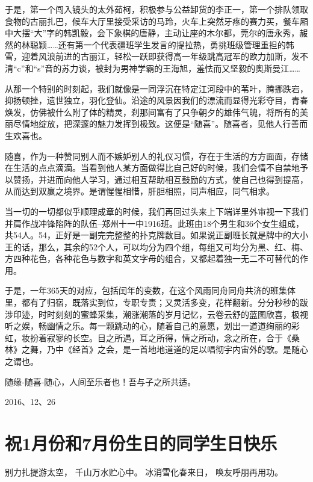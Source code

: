 \documentclass[openany]{ctexbook}
\begin{document}
于是，第一个闯入镜头的太外茹柯，积极参与公益卸货的李正一，第一个排队领取食物的古丽扎巴，候车大厅里接受采访的马玲，火车上突然牙疼的赛力买，餐车厢中大摆``大''字的韩凯毅，会下象棋的唐静，主动让座的木尔都，莞尔的唐永秀，赧然的林聪颖\ldots{}\ldots{}还有第一个代表疆班学生发言的提拉热，勇挑班级管理重担的韩雪，迎着风浪前进的古丽江，轻松一跃即获得高一年级跳高冠军的欧力加斯，发不清``c''和``s''音的苏力谈，被封为男神学霸的王海旭，羞怯而又坚毅的奥斯曼江\ldots{}\ldots{}

从那一个特别的时刻起，我们就像是一同浮沉在特定江河段中的苇叶，腾挪跌宕，抑扬顿挫，遗世独立，羽化登仙。沿途的风景因我们的漂流而显得光彩夺目，青春焕发，仿佛被什么附了体的精灵，刹那间富有了只争朝夕的雄伟气魄，将所有的美丽尽情地绽放，把深邃的魅力发挥到极致。这便是``随喜''。随喜者，见他人行善而生欢喜也。

随喜，作为一种赞同别人而不嫉妒别人的礼仪习惯，存在于生活的方方面面，存储在生活的点点滴滴。当看到他人某方面做得比自己好的时候，我们会情不自禁地予以赞扬，并进而向他人学习，通过相互帮助相互鼓励的方式，使自己也得到提高，从而达到双赢之境界。是谓惺惺相惜，肝胆相照，同声相应，同气相求。

当一切的一切都似乎顺理成章的时候，我们再回过头来上下端详里外审视一下我们并肩作战冲锋陷阵的队伍--郑州十一中1916班。此班由18个男生和36个女生组成，共54人。54，正好是一副完完整整的扑克牌数目。如果说正副班长就是牌中的大小王的话，那么，其余的52个人，可以均分为四个组，每组又可均分为黑、红、梅、方四种花色，各种花色与数字和英文字母的组合，又都起着独一无二不可替代的作用。

于是，一年365天的对应，包括闰年的变数，在这个风雨同舟同舟共济的班集体里，都有了归宿，既落实到位，专职专责；又灵活多变，花样翻新。分分秒秒的跋涉印迹，时时刻刻的蜜蜂采集，潮涨潮落的岁月记忆，云卷云舒的蓝图欣喜，极视听之娱，畅幽情之乐。每一颗跳动的心，随着自己的意愿，划出一道道绚丽的彩虹，妆扮着寂寥的长空。目之所遇，耳之所得，情之所动，念之所在，合于《桑林》之舞，乃中《经首》之会，是一首地地道道的足以唱彻宇内宙外的歌。是随心之谓也。

随缘-随喜-随心，人间至乐者也！吾与子之所共适。

2016、12、26

\chapter*{祝1月份和7月份生日的同学生日快乐}\label{birthday1}

别力扎提游太空， 千山万水贮心中。 冰消雪化春来日， 唤友呼朋再用功。
\end{document}
